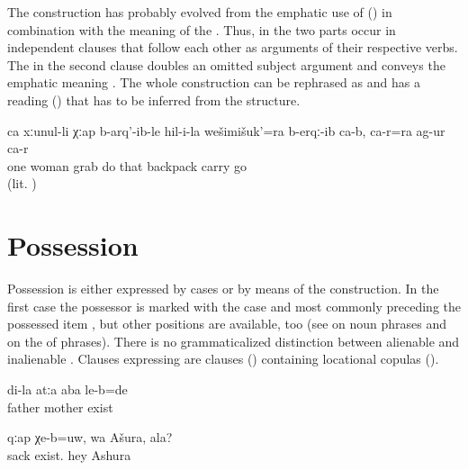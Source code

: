 The construction has probably evolved from the emphatic use of  () in combination with the  meaning of the  . Thus, in  the two parts occur in independent clauses that follow each other as arguments of their respective verbs. The  in the second clause doubles an omitted subject argument and conveys the emphatic meaning . The whole construction can be rephrased as  and has a  reading () that has to be inferred from the structure.
%
\begin{exe}
	\ex	\label{ex:There one woman grabbed his backpack, took it, and went away with it}
	\gll	ca	xːunul-li	χːap	b-arq'-ib-le	hil-i-la	wešimišuk'=ra b-erqː-ib	ca-b,	ca-r=ra	ag-ur	ca-r\\
		one	woman	grab	do	that	backpack carry			go	\\
	\glt	{} (lit. )
\end{exe}



\section{Possession}
\label{sec:Possession}

Possession is either expressed by cases or by means of the  construction. In the first case the possessor is marked with the  case and most commonly preceding the possessed item , but other positions are available, too  (see  on noun phrases and  on the  of phrases). There is no grammaticalized distinction between alienable and inalienable . Clauses expressing  are  clauses () containing locational copulas ().
%
\begin{exe}
	\ex	\label{ex:I had mother and father}
	\gll	di-la	atːa	aba	le-b=de\\
			father	mother	exist\\
	\glt	{}

	\ex	\label{ex:‎Is your sack there, Ashura}
	\gll	qːap	χe-b=uw,	wa	Ašura,		ala?\\
		sack	exist.	hey	Ashura		\\
	\glt	{}
\end{exe}

